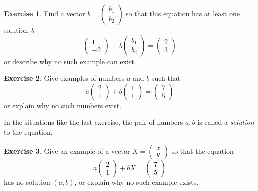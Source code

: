 \documentclass[11pt]{amsart}
\theoremstyle{definition}
\newtheorem{exercise}{Exercise}
\begin{document}
\begin{exercise}
Find a vector $b = \left( \begin{smallmatrix} b_1 \\ b_2 \end{smallmatrix} \right)$ so that this equation has at least one solution $\lambda$
\[
\begin{pmatrix} 1 \\ -2 \end{pmatrix} + \lambda \begin{pmatrix} b_1 \\ b_2 \end{pmatrix} = \begin{pmatrix} 2 \\ 3 \end{pmatrix}
\]
or describe why no such example can exist.
\end{exercise}

\begin{exercise}
Give examples of numbers $a$ and $b$ such that
\[ a \begin{pmatrix} 2 \\ 1 \end{pmatrix} + b \begin{pmatrix} 1 \\ 1 \end{pmatrix} = \begin{pmatrix} 7 \\ 5 \end{pmatrix}
\]
or explain why no such numbers exist.
\end{exercise}

In the situations like the last exercise, the pair of numbers $a, b$ is called a \emph{solution} to the equation.

\begin{exercise}
Give an example of a vector $X = \left( \begin{smallmatrix} x \\ y \end{smallmatrix} \right)$ so that the equation
\[
a \begin{pmatrix} 2 \\ 1 \end{pmatrix} + b X = \begin{pmatrix}7 \\ 5 \end{pmatrix}
\]
has no solution $(a,b)$, or explain why no such example exists.
\end{exercise}
\end{document}
